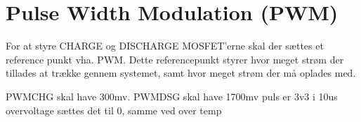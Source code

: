 \section{Pulse Width Modulation (PWM)}
For at styre CHARGE og DISCHARGE MOSFET'erne skal der sættes et reference punkt vha. PWM. Dette referencepunkt styrer hvor meget strøm der tillades at trække gennem systemet, samt hvor meget strøm der må oplades med. 

PWMCHG skal have 300mv. PWMDSG skal have 1700mv
puls er 3v3 i 10us 
overvoltage sættes det til 0, samme ved over temp

